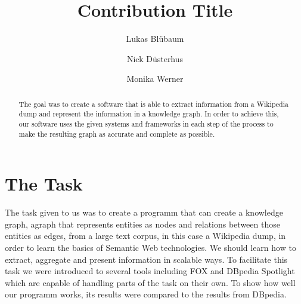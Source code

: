 \documentclass[runningheads]{llncs}
\begin{document}
%
\title{Contribution Title}%
%
%
\author{Lukas Bl{\"u}baum
	\and
Nick D{\"u}sterhus
 \and
Monika Werner}
%
%
%
\maketitle              %
%
\begin{abstract}
The goal was to create a software that is able to extract information from a Wikipedia dump and represent the information in a knowledge graph. In order to achieve this, our software uses the given systems and frameworks in each step of the process to make the resulting graph as accurate and complete as possible. 

\end{abstract}
%
%
\section{The Task}
The task given to us was to create a programm that can create a knowledge graph, agraph that represents entities as nodes and relations between those entities as edges, from a large text corpus, in this case a Wikipedia dump, in order to learn the basics of Semantic Web technologies. We should learn how to extract, aggregate and present information in scalable ways. To facilitate this task we were introduced to several tools including FOX and DBpedia Spotlight which are capable of handling parts of the task on their own. To show how well our programm works, its results were compared to the results from DBpedia. 
\end{document}
